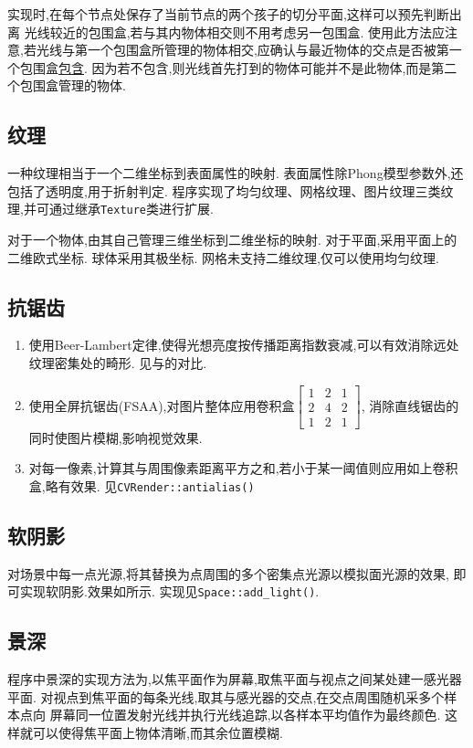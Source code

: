 实现时,在每个节点处保存了当前节点的两个孩子的切分平面,这样可以预先判断出离
光线较近的包围盒,若与其内物体相交则不用考虑另一包围盒.
使用此方法应注意,若光线与第一个包围盒所管理的物体相交,应确认与最近物体的交点是否被第一个包围盒\underline{包含}.
因为若不包含,则光线首先打到的物体可能并不是此物体,而是第二个包围盒管理的物体.

\subsection{纹理}
一种纹理相当于一个二维坐标到表面属性的映射.
表面属性除Phong模型参数外,还包括了透明度,用于折射判定.
程序实现了均匀纹理、网格纹理、图片纹理三类纹理,并可通过继承\verb|Texture|类进行扩展.

对于一个物体,由其自己管理三维坐标到二维坐标的映射.
对于平面,采用平面上的二维欧式坐标. 球体采用其极坐标.
网格未支持二维纹理,仅可以使用均匀纹理.

\subsection{抗锯齿}
\begin{enumerate}
  \item 使用Beer-Lambert定律,使得光想亮度按传播距离指数衰减,可以有效消除远处纹理密集处的畸形.
    见与的对比.

  \item 使用全屏抗锯齿(FSAA),对图片整体应用卷积盒$\begin{bmatrix}1 & 2 & 1\\2 & 4 & 2\\1 & 2 & 1\end{bmatrix} $,
    消除直线锯齿的同时使图片模糊,影响视觉效果.

  \item 对每一像素,计算其与周围像素距离平方之和,若小于某一阈值则应用如上卷积盒,略有效果. 见\verb|CVRender::antialias()|
\end{enumerate}

\subsection{软阴影}
对场景中每一点光源,将其替换为点周围的多个密集点光源以模拟面光源的效果,
即可实现软阴影.效果如所示. 实现见\verb|Space::add_light()|.

\subsection{景深}
程序中景深的实现方法为,以焦平面作为屏幕,取焦平面与视点之间某处建一感光器平面.
对视点到焦平面的每条光线,取其与感光器的交点,在交点周围随机采多个样本点向
屏幕同一位置发射光线并执行光线追踪,以各样本平均值作为最终颜色.
这样就可以使得焦平面上物体清晰,而其余位置模糊.

